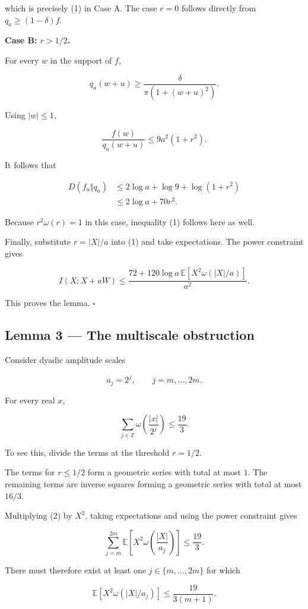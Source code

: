 \documentclass[11pt]{article}
\begin{document}
which is precisely (1) in Case A. The case \(r=0\) follows directly from \(q_a\geq(1-\delta)f\).

\textbf{Case B: \(r>1/2\).}

For every \(w\) in the support of \(f\),

\[
q_a(w+u)\geq
\frac{\delta}{\pi(1+(w+u)^2)}.
\]

Using \(|w|\leq1\),

\[
\frac{f(w)}{q_a(w+u)}
\leq9a^2(1+r^2).
\]

It follows that

\[
\begin{aligned}
D(f_u\Vert q_a)
&\leq2\log a+\log9+\log(1+r^2)\\
&\leq2\log a+70r^2.
\end{aligned}
\]

Because \(r^2\omega(r)=1\) in this case, inequality (1) follows here as well.

Finally, substitute \(r=|X|/a\) into (1) and take expectations. The power constraint gives

\[
I(X;X+aW)
\leq
\frac{72+
120\log a\,\mathbb E[X^2\omega(|X|/a)]}{a^2}.
\]

This proves the lemma. \(\square\)

\subsection{Lemma 3 --- The multiscale obstruction}

Consider dyadic amplitude scales

\[
a_j=2^j,\qquad j=m,\ldots,2m.
\]

For every real \(x\),

\[
\sum_{j\in\mathbb Z}
\omega\left(\frac{|x|}{2^j}\right)
\leq\frac{19}{3}.
\tag{2}
\]

To see this, divide the terms at the threshold \(r=1/2\).

The terms for \(r\leq1/2\) form a geometric series with total at most \(1\). The remaining terms are inverse squares forming a geometric series with total at most \(16/3\).

Multiplying (2) by \(X^2\), taking expectations and using the power constraint gives

\[
\sum_{j=m}^{2m}
\mathbb E\left[
X^2\omega\left(\frac{|X|}{a_j}\right)
\right]
\leq\frac{19}{3}.
\]

There must therefore exist at least one \(j\in\{m,\ldots,2m\}\) for which

\[
\boxed{
\mathbb E[X^2\omega(|X|/a_j)]
\leq\frac{19}{3(m+1)}.
}
\]
\end{document}
